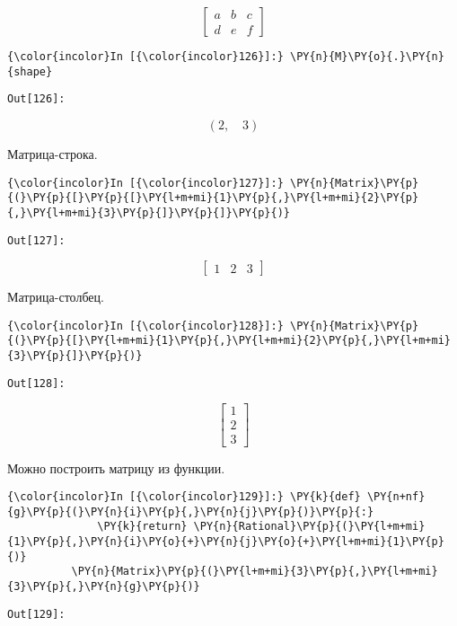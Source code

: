     \[\left[\begin{matrix}a & b & c\\d & e & f\end{matrix}\right]\]

    

    \begin{Verbatim}[commandchars=\\\{\}]
{\color{incolor}In [{\color{incolor}126}]:} \PY{n}{M}\PY{o}{.}\PY{n}{shape}
\end{Verbatim}
\texttt{\color{outcolor}Out[{\color{outcolor}126}]:}
    
    \[\left ( 2, \quad 3\right )\]

    

    Матрица-строка.

    \begin{Verbatim}[commandchars=\\\{\}]
{\color{incolor}In [{\color{incolor}127}]:} \PY{n}{Matrix}\PY{p}{(}\PY{p}{[}\PY{p}{[}\PY{l+m+mi}{1}\PY{p}{,}\PY{l+m+mi}{2}\PY{p}{,}\PY{l+m+mi}{3}\PY{p}{]}\PY{p}{]}\PY{p}{)}
\end{Verbatim}
\texttt{\color{outcolor}Out[{\color{outcolor}127}]:}
    
    \[\left[\begin{matrix}1 & 2 & 3\end{matrix}\right]\]

    

    Матрица-столбец.

    \begin{Verbatim}[commandchars=\\\{\}]
{\color{incolor}In [{\color{incolor}128}]:} \PY{n}{Matrix}\PY{p}{(}\PY{p}{[}\PY{l+m+mi}{1}\PY{p}{,}\PY{l+m+mi}{2}\PY{p}{,}\PY{l+m+mi}{3}\PY{p}{]}\PY{p}{)}
\end{Verbatim}
\texttt{\color{outcolor}Out[{\color{outcolor}128}]:}
    
    \[\left[\begin{matrix}1\\2\\3\end{matrix}\right]\]

    

    Можно построить матрицу из функции.

    \begin{Verbatim}[commandchars=\\\{\}]
{\color{incolor}In [{\color{incolor}129}]:} \PY{k}{def} \PY{n+nf}{g}\PY{p}{(}\PY{n}{i}\PY{p}{,}\PY{n}{j}\PY{p}{)}\PY{p}{:}
              \PY{k}{return} \PY{n}{Rational}\PY{p}{(}\PY{l+m+mi}{1}\PY{p}{,}\PY{n}{i}\PY{o}{+}\PY{n}{j}\PY{o}{+}\PY{l+m+mi}{1}\PY{p}{)}
          \PY{n}{Matrix}\PY{p}{(}\PY{l+m+mi}{3}\PY{p}{,}\PY{l+m+mi}{3}\PY{p}{,}\PY{n}{g}\PY{p}{)}
\end{Verbatim}
\texttt{\color{outcolor}Out[{\color{outcolor}129}]:}
    
